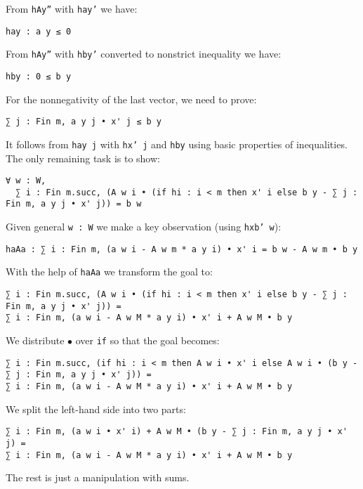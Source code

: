 \documentclass[]{article}
\renewcommand{\.}{\hskip .75pt}
\begin{document}
From \texttt{hAy''} with \texttt{hay'} we have:
\begin{lstlisting}
hay : a y ≤ 0
\end{lstlisting}
From \texttt{hAy''} with \texttt{hby'} converted to nonstrict inequality we have:
\begin{lstlisting}
hby : 0 ≤ b y
\end{lstlisting}
For the nonnegativity of the last vector, we need to prove:
\begin{lstlisting}
∑ j : Fin m, a y j • x' j ≤ b y
\end{lstlisting}
It follows from \texttt{hay j} with \texttt{hx' j} and \texttt{hby} using basic properties of inequalities.
The only remaining task is to show:
\begin{lstlisting}
∀ w : W, 
  ∑ i : Fin m.succ, (A w i • (if hi : i < m then x' i else b y - ∑ j : Fin m, a y j • x' j)) = b w
\end{lstlisting}
Given general \texttt{w :~W} we make a key observation (using \texttt{hxb' w}):
\begin{lstlisting}
haAa : ∑ i : Fin m, (a w i - A w m * a y i) • x' i = b w - A w m • b y
\end{lstlisting}
With the help of \texttt{haAa} we transform the goal to:
\begin{lstlisting}
∑ i : Fin m.succ, (A w i • (if hi : i < m then x' i else b y - ∑ j : Fin m, a y j • x' j)) =
∑ i : Fin m, (a w i - A w M * a y i) • x' i + A w M • b y
\end{lstlisting}
We distribute $\bullet$ over \texttt{if} so that the goal becomes:
\begin{lstlisting}
∑ i : Fin m.succ, (if hi : i < m then A w i • x' i else A w i • (b y - ∑ j : Fin m, a y j • x' j)) =
∑ i : Fin m, (a w i - A w M * a y i) • x' i + A w M • b y
\end{lstlisting}
We split the left-hand side into two parts:
\begin{lstlisting}
∑ i : Fin m, (a w i • x' i) + A w M • (b y - ∑ j : Fin m, a y j • x' j) =
∑ i : Fin m, (a w i - A w M * a y i) • x' i + A w M • b y
\end{lstlisting}
The rest is just a manipulation with sums.
\end{document}
